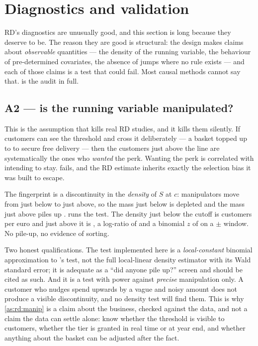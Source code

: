 \section{Diagnostics and validation}
\label{sec:rd:valid}

RD's diagnostics are unusually good, and this section is long because they deserve to be. The
reason they are good is structural: the design makes claims about \emph{observable} quantities ---
the density of the running variable, the behaviour of pre-determined covariates, the absence of
jumps where no rule exists --- and each of those claims is a test that could fail. Most causal
methods cannot say that.  is the audit in full.



\subsection*{A2 --- is the running variable manipulated?}

This is the assumption that kills real RD studies, and it kills them silently. If customers can see
the threshold and cross it deliberately --- a  basket topped up to  to secure free
delivery --- then the customers just above the line are systematically the ones who \emph{wanted}
the perk. Wanting the perk is correlated with intending to stay.  fails, and the
RD estimate inherits exactly the selection bias it was built to escape.

The fingerprint is a discontinuity in the \emph{density} of $S$ at $c$: manipulators move from just
below to just above, so the mass just below is depleted and the mass just above piles up
\citep{mccrary2008}.  runs the test. The density just below the cutoff is
\nbNineMccBelow{} customers per euro and just above it is \nbNineMccAbove{}, a log-ratio of
\nbNineMccLogRatio{} and a binomial $z$ of \nbNineMccZ{} on a $\pm$\eur{\nbNineMccBw} window. No
pile-up, no evidence of sorting.



Two honest qualifications. The test implemented here is a \emph{local-constant} binomial
approximation to \citeauthor{mccrary2008}'s test, not the full local-linear density estimator with
its Wald standard error; it is adequate as a ``did anyone pile up?'' screen and should be cited as
such. And it is a test with power against \emph{precise} manipulation only. A customer who nudges
spend upwards by a vague and noisy amount does not produce a visible discontinuity, and no density
test will find them. This is why \cref{as:rd:manip} is a claim about the business, checked against
the data, and not a claim the data can settle alone: know whether the threshold is visible to
customers, whether the tier is granted in real time or at year end, and whether anything about the
basket can be adjusted after the fact.

